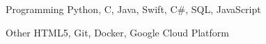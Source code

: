 


\begin{cvskills}


\cvskill
{Programming} %
{Python, C, Java, Swift, C\#, SQL, JavaScript} %


\cvskill
{Other} %
{HTML5, Git, Docker, Google Cloud Platform} %



\end{cvskills}
